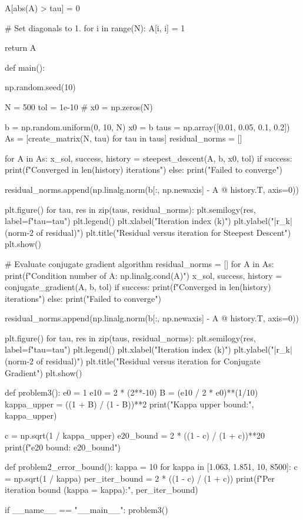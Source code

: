 \documentclass{homework}
\begin{document}
\begin{python}
    A[abs(A) > tau] = 0

    # Set diagonals to 1.
    for i in range(N):
        A[i, i] = 1

    return A

def main():

    np.random.seed(10)

    N = 500
    tol = 1e-10
    # x0 = np.zeros(N)

    b = np.random.uniform(0, 10, N)
    x0 = b
    taus = np.array([0.01, 0.05, 0.1, 0.2])
    As = [create_matrix(N, tau) for tau in taus]
    residual_norms = []

    for A in As:
        x_sol, success, history = steepest_descent(A, b, x0, tol)
        if success:
            print(f"Converged in {len(history)} iterations")
        else:
            print("Failed to converge")

        residual_norms.append(np.linalg.norm(b[:, np.newaxis] - A @ history.T, axis=0))

    plt.figure()
    for tau, res in zip(taus, residual_norms):
        plt.semilogy(res, label=f"tau={tau}")
    plt.legend()
    plt.xlabel("Iteration index (k)")
    plt.ylabel("|r_k| (norm-2 of residual)")
    plt.title("Residual versus iteration for Steepest Descent")
    plt.show()

    # Evaluate conjugate gradient algorithm
    residual_norms = []
    for A in As:
        print(f"Condition number of A: {np.linalg.cond(A)}")
        x_sol, success, history = conjugate_gradient(A, b, tol)
        if success:
            print(f"Converged in {len(history)} iterations")
        else:
            print("Failed to converge")

        residual_norms.append(np.linalg.norm(b[:, np.newaxis] - A @ history.T, axis=0))

    plt.figure()
    for tau, res in zip(taus, residual_norms):
        plt.semilogy(res, label=f"tau={tau}")
    plt.legend()
    plt.xlabel("Iteration index (k)")
    plt.ylabel("|r_k| (norm-2 of residual)")
    plt.title("Residual versus iteration for Conjugate Gradient")
    plt.show()


def problem3():
    e0 = 1
    e10 = 2 * (2**-10)
    B = (e10 / 2 * e0)**(1/10)
    kappa_upper = ((1 + B) / (1 - B))**2
    print("Kappa upper bound:", kappa_upper)

    c = np.sqrt(1 / kappa_upper)
    e20_bound = 2 * ((1 - c) / (1 + c))**20
    print(f"e20 bound: {e20_bound}")

def problem2_error_bound():
    kappa = 10
    for kappa in [1.063, 1.851, 10, 8500]:
        c = np.sqrt(1 / kappa)
        per_iter_bound = 2 * ((1 - c) / (1 + c))
        print(f"Per iteration bound (kappa = {kappa}):", per_iter_bound)




if __name__ == "__main__":
    problem3()



\end{python}
\end{document}

